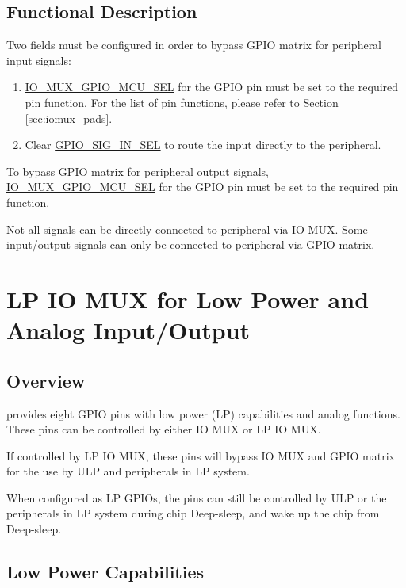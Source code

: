 \documentclass[main\_\_EN.tex]{subfiles}
\begin{document}
\subsection{Functional Description}

Two fields must be configured in order to bypass GPIO matrix for peripheral input signals:

\begin{enumerate}
\item \hyperref[fielddesc:IOMUXGPIONMCUSEL]{IO\_MUX\_GPIO\_MCU\_SEL} for the GPIO pin must be set to the required pin function. For the list of pin functions, please refer to Section  \ref{sec:iomux_pads}.
\item Clear \hyperref[fielddesc:GPIOSIGNINSEL]{GPIO\_SIG\_IN\_SEL} to route the input directly to the peripheral.
\end{enumerate}

To bypass GPIO matrix for peripheral output signals, \hyperref[fielddesc:IOMUXGPIONMCUSEL]{IO\_MUX\_GPIO\_MCU\_SEL} for the GPIO pin must be set to the required pin function.

\begin{tiplisting}
Not all signals can be directly connected to peripheral via IO MUX. Some input/output signals can only be connected to peripheral via GPIO matrix.
\end{tiplisting}

\section{LP IO MUX for Low Power and Analog Input/Output}

\subsection{Overview}

\chipname{} provides eight GPIO pins with low power (LP) capabilities and analog functions. These pins can be controlled by either IO MUX or LP IO MUX. 

If controlled by LP IO MUX, these pins will bypass IO MUX and GPIO matrix for the use by ULP and peripherals in LP system. 

When configured as LP GPIOs, the pins can still be controlled by ULP or the peripherals in LP system during chip Deep-sleep, and wake up the chip from Deep-sleep.

\subsection{Low Power Capabilities}
\end{document}
